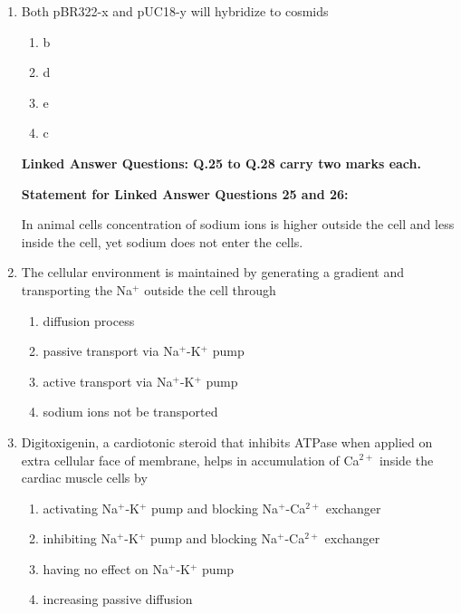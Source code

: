 \documentclass[journal,12pt,onecolumn]{IEEEtran}
\begin{document}
\begin{enumerate}
\item Both pBR322-x and pUC18-y will hybridize to cosmids
\begin{multicols}{2}
\begin{enumerate}[label=(\Alph*)]
\item b
\item d
\item e
\item c
\end{enumerate}
\end{multicols}

\noindent\textbf{Linked Answer Questions: Q.25 to Q.28 carry two marks each.}

\noindent\textbf {Statement for Linked Answer Questions 25 and 26:}

In animal cells concentration of sodium ions is higher outside the cell and less inside the cell, yet sodium does not enter the cells.


\item The cellular environment is maintained by generating a gradient and transporting the Na$^+$ outside the cell through
\begin{multicols}{2}
\begin{enumerate}[label=(\Alph*)]
\item diffusion process
\item passive transport via Na$^+$-K$^+$ pump
\item active transport via Na$^+$-K$^+$ pump
\item sodium ions not be transported
\end{enumerate}
\end{multicols}

\item Digitoxigenin, a cardiotonic steroid that inhibits ATPase when applied on extra cellular face of membrane, helps in accumulation of Ca$^{2+}$ inside the cardiac muscle cells by
\begin{multicols}{2}
\begin{enumerate}[label=(\Alph*)]
\item activating Na$^+$-K$^+$ pump and blocking Na$^+$-Ca$^{2+}$ exchanger
\item inhibiting Na$^+$-K$^+$ pump and blocking Na$^+$-Ca$^{2+}$ exchanger
\item having no effect on Na$^+$-K$^+$ pump
\item increasing passive diffusion
\end{enumerate}
\end{multicols}


\end{enumerate}
\end{document}

